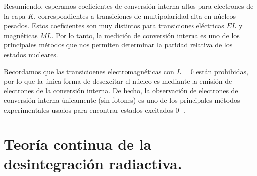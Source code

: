 Resumiendo, esperamos coeficientes de conversión interna altos para electrones de la capa $K$, correspondientes a transiciones de multipolaridad alta en núcleos pesados. Estos coeficientes son muy distintos para transiciones eléctricas $EL$ y magnéticas $ML$. Por lo tanto, la medición de conversión interna es uno de los principales métodos que nos permiten determinar la paridad relativa de los estados nucleares. 

Recordamos que las transicioenes electromagnéticas con $L=0$ están prohibidas, por lo que la única forma de desexcitar el núcleo es mediante la emisión de electrones de la conversión interna. De hecho, la observación de electrones de conversión interna únicamente (sin fotones) es uno de los principales métodos experimentales usados para encontrar estados excitados $0^+$.



\section{Teoría continua de la desintegración radiactiva.}

